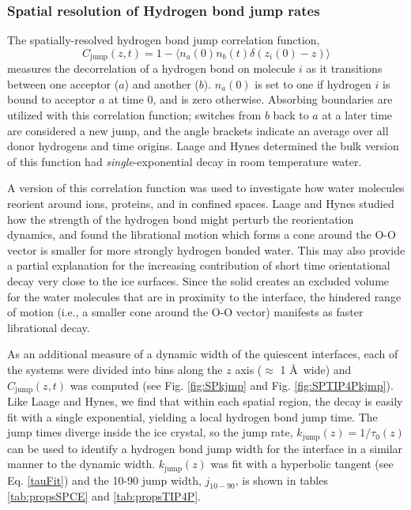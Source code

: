 \subsubsection{Spatial resolution of Hydrogen bond jump rates}
The spatially-resolved hydrogen bond jump correlation function,
\begin{equation}\label{jump}
C_\mathrm{jump}(z,t) = 1 - \langle n_a(0) n_b(t) \delta(z_i(0) - z) \rangle
\end{equation}
measures the decorrelation of a hydrogen bond on molecule $i$ as it
transitions between one acceptor ($a$) and another ($b$). $n_a(0)$ is
set to one if hydrogen $i$ is bound to acceptor $a$ at time $0$, and
is zero otherwise.  Absorbing boundaries are utilized with this
correlation function; switches from $b$ back to $a$ at a later time
are considered a new jump, and the angle brackets indicate an average
over all donor hydrogens and time origins. Laage and Hynes determined
the bulk version of this function had \textit{single}-exponential
decay in room temperature water.

A version of this correlation function was used to investigate how
water molecules reorient around
ions\cite{Laage2007,Laage2008a,Stirnemann2011a,Laage2011},
proteins\cite{Duboue-Dijon2014}, and in confined
spaces\cite{Laage2012b,Fogarty2014}.  Laage and Hynes studied how the
strength of the hydrogen bond might perturb the reorientation
dynamics,\cite{Laage2006a} and found the librational motion which
forms a cone around the O-O vector is smaller for more strongly
hydrogen bonded water. This may also provide a partial explanation for
the increasing contribution of short time orientational decay very
close to the ice surfaces.  Since the solid creates an excluded volume
for the water molecules that are in proximity to the interface, the
hindered range of motion (i.e., a smaller cone around the O-O vector)
manifests as faster librational decay.

As an additional measure of a dynamic width of the quiescent
interfaces, each of the systems were divided into bins along the $z$
axis ($\approx$ 1 \AA\ wide) and $C_\mathrm{jump}(z,t)$ was computed
(see Fig. \ref{fig:SPkjmp} and Fig. \ref{fig:SPTIP4Pkjmp}).
Like Laage and Hynes, we find that within each spatial region, the
decay is easily fit with a single exponential, yielding a local
hydrogen bond jump time. The jump times diverge inside the ice
crystal, so the jump rate, $k_\mathrm{jump}(z) = 1 / \tau_0(z)$ can be
used to identify a hydrogen bond jump width for the interface in a
similar manner to the dynamic width. $k_\mathrm{jump}(z)$ was fit with
a hyperbolic tangent (see Eq. \eqref{tauFit}) and the 10-90 jump
width, $j_\mathrm{10-90}$, is shown in tables \ref{tab:propsSPCE} and
\ref{tab:propsTIP4P}.

